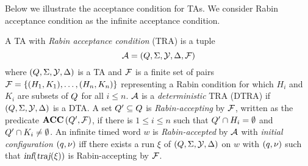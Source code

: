 Below we illustrate the acceptance condition for TAs.
We consider Rabin acceptance condition as the infinite acceptance condition.


\vspace{-0.5em}
\begin{definition}
A TA with \emph{Rabin acceptance condition} (TRA) is a tuple
\begin{equation}\label{eq:tra}
    \mathcal{A}=(Q,\Sigma,\mathcal{Y},\Delta,\mathcal{F})
\end{equation}
where $(Q,\Sigma,\mathcal{Y},\Delta)$ is a TA and $\mathcal{F}$ is a finite
set of pairs
$
    \mathcal{F}
        = \{
            (H_1,K_1 ),
            \dots,
            (H_n,K_n)
        \}
$ representing a Rabin condition for which
$H_i$ and $K_i$ are subsets of $Q$ for all $i\le n$.
$\mathcal{A}$ is a \emph{deterministic} TRA (DTRA) if $(Q,\Sigma,\mathcal{Y},\Delta)$ is a DTA.
A set $Q' \subseteq Q $ is \emph{Rabin-accepting} by $\mathcal{F}$,
written as the predicate $\mbox{\bf ACC} \left( {Q'}, {\mathcal{F}} \right)$,
if there is $ 1 \leq i \leq n$ such that $ Q' \cap H_i= \emptyset $
and $ Q' \cap K_i \neq \emptyset $. An infinite timed word $w$ is \emph{Rabin-accepted} by
$\mathcal{A}$ with \emph{initial configuration} $(q,\nu)$ iff there exists a run $\xi$ of $(Q,\Sigma,\mathcal{Y},\Delta)$ on $w$ with $(q,\nu)$ such that
$
    \mbox{\sl inf} ( 
         \mbox{\sl traj} ( \xi )
     )
$ is Rabin-accepting by $\mathcal{F}$.
\end{definition}

%         

